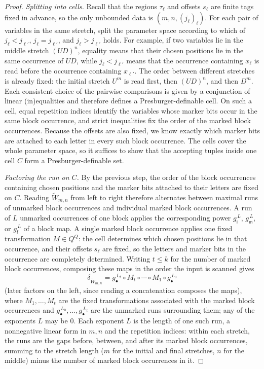 \documentclass[11pt]{article}
\theoremstyle{definition}
\begin{document}
\begin{proof}
\vspace{0.5em}
\noindent\emph{Splitting into cells.}  Recall that the regions $\tau_\ell$ and
offsets $s_\ell$ are finite tags fixed in advance, so the only unbounded data is
$(m,n,(j_\ell)_\ell)$.  For each pair of variables in the same stretch, split
the parameter space according to which of $j_\ell<j_{\ell'}$,
$j_\ell=j_{\ell'}$, and $j_\ell>j_{\ell'}$ holds.  For example, if two
variables lie in the middle stretch $(UD)^n$, equality means that their chosen
positions lie in the same occurrence of $UD$, while $j_\ell<j_{\ell'}$ means
that the occurrence containing $x_\ell$ is read before the occurrence
containing $x_{\ell'}$.  The order between different stretches is already
fixed: the initial stretch $U^m$ is read first, then $(UD)^n$, and then $D^m$.
Each consistent choice of the pairwise comparisons is given by a conjunction
of linear (in)equalities and therefore defines a Presburger-definable cell.  On
such a cell, equal repetition indices identify the variables whose marker bits
occur in the same block occurrence, and strict inequalities fix the order of
the marked block occurrences.  Because the offsets are also fixed, we know
exactly which marker bits are attached to each letter in every such block
occurrence.  The cells cover the whole parameter space, so it suffices to show
that the accepting tuples inside one cell $C$ form a Presburger-definable set.

\vspace{0.5em}
\noindent\emph{Factoring the run on $C$.}  By the previous step, the order of
the block occurrences containing chosen positions and the marker bits attached
to their letters are fixed on $C$.  Reading $\widetilde W_{m,n}$ from left to right therefore alternates
between maximal runs of unmarked block occurrences and individual marked block
occurrences.  A run of $L$ unmarked occurrences of one block applies the
corresponding power $g_{\mathsf i}^{\,L}$, $g_{\mathsf m}^{\,L}$, or
$g_{\mathsf f}^{\,L}$ of a block map.  A single marked block occurrence applies
one fixed transformation $M\in Q^Q$: the cell determines which chosen
positions lie in that occurrence, and their offsets $s_\ell$ are fixed, so the
letters and marker bits in the occurrence are completely determined.  Writing
$t\le k$ for the number of marked block occurrences, composing these maps in
the order the input is scanned
gives
\[
   \delta_{\widetilde W_{m,n}}
   = g_\bullet^{\,L_t}\circ M_t\circ\cdots\circ M_1\circ g_\bullet^{\,L_0}
\]
(later factors on the left, since reading a concatenation composes the maps),
where $M_1,\ldots,M_t$ are the fixed transformations associated with the
marked block occurrences and
$g_\bullet^{\,L_0},\ldots,g_\bullet^{\,L_t}$ are the unmarked runs surrounding
them; any of the exponents $L$ may be $0$.  Each exponent $L$ is the length of one such run, a
nonnegative linear form in $m,n$ and the repetition indices: within each stretch, the
runs are the gaps before, between, and after its marked block occurrences, summing to the
stretch length ($m$ for the initial and final stretches, $n$ for the middle)
minus the number of marked block occurrences in it.


\end{proof}
\end{document}
